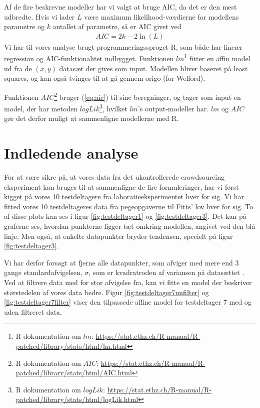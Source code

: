 Af de fire beskrevne modeller har vi valgt at bruge AIC, da det er den mest udbredte. Hvis vi lader $L$ være maximum likelihood-værdierne for modellens parametre og $k$ antallet af parametre, så er AIC givet ved
\begin{align}
AIC = 2k - 2\ln(L) \label{eq:aic}
\end{align}
Vi har til vores analyse brugt programmeringssproget R, som både har lineær regression og AIC-funktionalitet indbygget. Funktionen $lm$\footnote{R dokumentation om $lm$: \url{https://stat.ethz.ch/R-manual/R-patched/library/stats/html/lm.html}} fitter en affin model ud fra de $(x,y)$ datasæt der gives som input. Modellen bliver baseret på least squares, og kan også tvinges til at gå gennem origo (for Welford).

Funktionen $AIC$\footnote{R dokumentation om $AIC$: \url{https://stat.ethz.ch/R-manual/R-patched/library/stats/html/AIC.html}} bruger (\ref{eq:aic}) til sine beregninger, og tager som input en model, der har metoden $logLik$\footnote{R dokumentation om $logLik$: \url{https://stat.ethz.ch/R-manual/R-patched/library/stats/html/logLik.html}}, hvilket $lm$'s output-modeller har. $lm$ og $AIC$ gør det derfor muligt at sammenligne modellerne med R.

\section*{Indledende analyse}
For at være sikre på, at vores data fra det ukontrollerede crowdsourcing eksperiment kan bruges til at sammenligne de fire formuleringer, har vi først kigget på vores 10 testdeltagere fra laboratieeksperimentet hver for sig. Vi har fitted vores 10 testdeltageres data fra pegeopgaverne til Fitts' lov hver for sig. To af disse plots kan ses i figur \ref{fig:testdeltager1} og \ref{fig:testdeltager3}.  Det kan på graferne ses, hvordan punkterne ligger tæt omkring modellen, angivet ved den blå linje. Men også, at enkelte datapunkter bryder tendensen, specielt på figur \ref{fig:testdeltager3}.

Vi har derfor forsøgt at fjerne alle datapunkter, som afviger med mere end 3 gange standardafvigelsen, $\sigma$, som er kvadratroden af variansen på datasættet \cite{pearson1894}. Ved at filtrere data med for stor afvigelse fra, kan vi fitte en model der beskriver størstedelen af vores data bedre. Figur \ref{fig:testdeltager7unfilter} og \ref{fig:testdeltager7filter} viser den tilpassede affine model for testdeltager 7 med og uden filtreret data.

